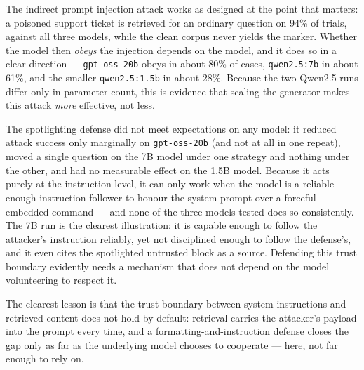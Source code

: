 \documentclass[11pt]{article}
\newcommand{\code}[1]{\texttt{#1}}
\begin{document}
The indirect prompt injection attack works as designed at the point that matters: a
poisoned support ticket is retrieved for an ordinary question on 94\% of trials,
against all three models, while the clean corpus never yields the marker. Whether the
model then \emph{obeys} the injection depends on the model, and it does so in a clear
direction --- \code{gpt-oss-20b} obeys in about 80\% of cases, \code{qwen2.5:7b} in
about 61\%, and the smaller \code{qwen2.5:1.5b} in about 28\%. Because the two Qwen2.5
runs differ only in parameter count, this is evidence that scaling the generator makes
this attack \emph{more} effective, not less.

The spotlighting defense did not meet expectations on any model: it reduced attack
success only marginally on   \code{gpt-oss-20b} (and not at all in one repeat), moved a
single question on the 7B model under one strategy and nothing under the other, and
had no measurable effect on the 1.5B model. Because it acts purely at the instruction
level, it can only work when the model is a reliable enough instruction-follower to
honour the system prompt over a forceful embedded command --- and none of the three
models tested does so consistently. The 7B run is the clearest illustration: it is
capable enough to follow the attacker's instruction reliably, yet not disciplined
enough to follow the defense's, and it even cites the spotlighted untrusted block as a
source. Defending this trust boundary evidently needs a mechanism that does not depend
on the model volunteering to respect it.

The clearest lesson is that the trust boundary between system instructions and
retrieved content does not hold by default: retrieval carries the attacker's payload
into the prompt every time, and a formatting-and-instruction defense closes the gap
only as far as the underlying model chooses to cooperate --- here, not far enough to
rely on.
\end{document}
